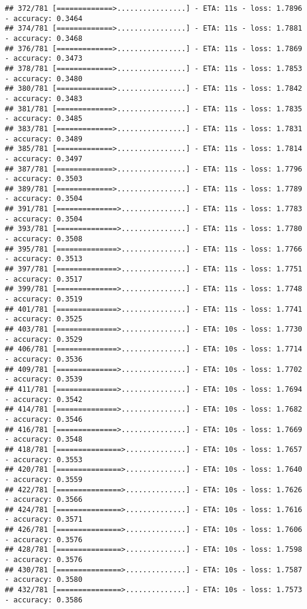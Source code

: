\documentclass[
]{article}
\begin{document}
\begin{verbatim}
## 372/781 [=============>................] - ETA: 11s - loss: 1.7896 - accuracy: 0.3464
## 374/781 [=============>................] - ETA: 11s - loss: 1.7881 - accuracy: 0.3468
## 376/781 [=============>................] - ETA: 11s - loss: 1.7869 - accuracy: 0.3473
## 378/781 [=============>................] - ETA: 11s - loss: 1.7853 - accuracy: 0.3480
## 380/781 [=============>................] - ETA: 11s - loss: 1.7842 - accuracy: 0.3483
## 381/781 [=============>................] - ETA: 11s - loss: 1.7835 - accuracy: 0.3485
## 383/781 [=============>................] - ETA: 11s - loss: 1.7831 - accuracy: 0.3489
## 385/781 [=============>................] - ETA: 11s - loss: 1.7814 - accuracy: 0.3497
## 387/781 [=============>................] - ETA: 11s - loss: 1.7796 - accuracy: 0.3503
## 389/781 [=============>................] - ETA: 11s - loss: 1.7789 - accuracy: 0.3504
## 391/781 [==============>...............] - ETA: 11s - loss: 1.7783 - accuracy: 0.3504
## 393/781 [==============>...............] - ETA: 11s - loss: 1.7780 - accuracy: 0.3508
## 395/781 [==============>...............] - ETA: 11s - loss: 1.7766 - accuracy: 0.3513
## 397/781 [==============>...............] - ETA: 11s - loss: 1.7751 - accuracy: 0.3517
## 399/781 [==============>...............] - ETA: 11s - loss: 1.7748 - accuracy: 0.3519
## 401/781 [==============>...............] - ETA: 11s - loss: 1.7741 - accuracy: 0.3525
## 403/781 [==============>...............] - ETA: 10s - loss: 1.7730 - accuracy: 0.3529
## 406/781 [==============>...............] - ETA: 10s - loss: 1.7714 - accuracy: 0.3536
## 409/781 [==============>...............] - ETA: 10s - loss: 1.7702 - accuracy: 0.3539
## 411/781 [==============>...............] - ETA: 10s - loss: 1.7694 - accuracy: 0.3542
## 414/781 [==============>...............] - ETA: 10s - loss: 1.7682 - accuracy: 0.3546
## 416/781 [==============>...............] - ETA: 10s - loss: 1.7669 - accuracy: 0.3548
## 418/781 [===============>..............] - ETA: 10s - loss: 1.7657 - accuracy: 0.3553
## 420/781 [===============>..............] - ETA: 10s - loss: 1.7640 - accuracy: 0.3559
## 422/781 [===============>..............] - ETA: 10s - loss: 1.7626 - accuracy: 0.3566
## 424/781 [===============>..............] - ETA: 10s - loss: 1.7616 - accuracy: 0.3571
## 426/781 [===============>..............] - ETA: 10s - loss: 1.7606 - accuracy: 0.3576
## 428/781 [===============>..............] - ETA: 10s - loss: 1.7598 - accuracy: 0.3576
## 430/781 [===============>..............] - ETA: 10s - loss: 1.7587 - accuracy: 0.3580
## 432/781 [===============>..............] - ETA: 10s - loss: 1.7573 - accuracy: 0.3586

\end{verbatim}
\end{document}

